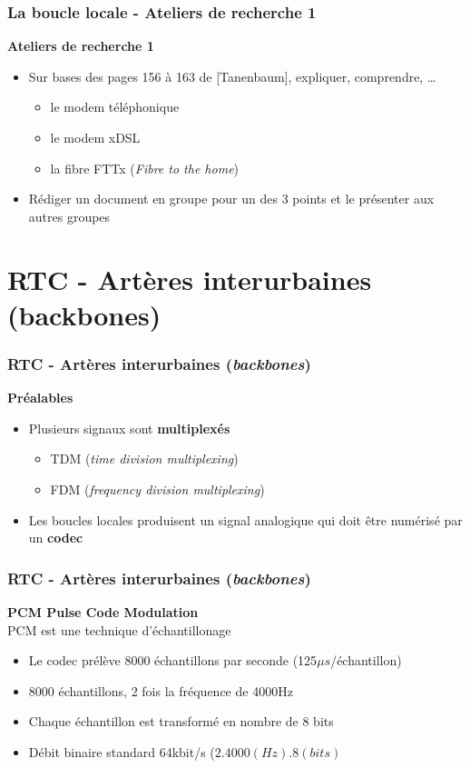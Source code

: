 \begin{frame}[fragile]
	\frametitle{La boucle locale - Ateliers de recherche 1}
{\large\bf Ateliers de recherche 1} 
\begin{itemize}
	\item Sur bases des pages 156 à 163 de [Tanenbaum], expliquer, comprendre, … 
	\begin{itemize}
		\item le modem téléphonique
		\item le modem xDSL
		\item la fibre FTTx (\textit{Fibre to the home})
	\end{itemize}
	\item Rédiger un document en groupe pour un des 3 points et le présenter aux autres
	groupes
\end{itemize}
\end{frame}



\section{RTC - Artères interurbaines (backbones)}

\begin{frame}[fragile]
  \frametitle{RTC - Artères interurbaines (\textit{backbones})}
{\large\bf Préalables}
\begin{itemize}
	\item Plusieurs signaux sont \textbf{multiplexés}
	\begin{itemize}
		\item TDM (\textit{time division multiplexing})
		\item FDM (\textit{frequency division multiplexing})
	\end{itemize}
	\item Les boucles locales produisent un signal analogique 
	qui doit être numérisé par un \textbf{codec}
\end{itemize}
\end{frame}

\begin{frame}[fragile]
	\frametitle{RTC - Artères interurbaines (\textit{backbones})}
{\large\bf PCM Pulse Code Modulation} \\
PCM est une technique d'échantillonage
\begin{itemize}
	\item Le codec prélève 8000 échantillons par seconde
	(125$\mu s$/échantillon)
	\item 8000 échantillons, 2 fois la fréquence de 4000Hz
	\item Chaque échantillon est transformé en nombre de 8 bits
	\item Débit binaire standard 64kbit/s ($2.4000(Hz).8(bits)$
\end{itemize}
\end{frame}

